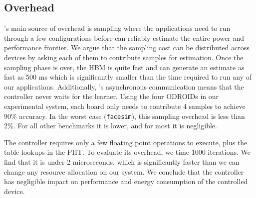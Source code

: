 
\subsection{Overhead}
\SYSTEM{}'s main source of overhead is sampling where the applications
need to run through a few configurations before \SYSTEM{} can reliably
estimate the entire power and performance frontier. We argue that the
sampling cost can be distributed across devices by asking each of them
to contribute samples for estimation. Once the sampling phase is over,
the HBM is quite fast and can generate an estimate as fast as 500 ms
which is significantly smaller than the time required to run any of
our applications.  Additionally, \SYSTEM{}'s asynchronous
communication means that the controller never waits for the learner.
Using the four ODROIDs in our experimental system, each board only
needs to contribute 4 samples to achieve 90\% accuracy.  In the worst
case (\texttt{facesim}), this sampling overhead is less than 2\%.  For
all other benchmarks it is lower, and for most it is negligible.

The controller requires only a few floating point operations to
execute, plus the table lookups in the PHT.  To evaluate its overhead,
we time 1000 iterations.  We find that it is under 2 microseconds,
which is significantly faster than we can change any resource
allocation on our system.  We conclude that the controller has
negligible impact on performance and energy consumption of the
controlled device.










